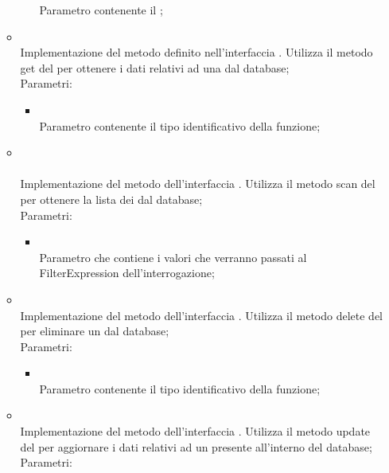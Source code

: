 \begin{itemize}
\begin{itemize}
\begin{itemize}
			Parametro contenente il ;
		\end{itemize}
		\item[]  \\		Implementazione del metodo definito nell'interfaccia . Utilizza il metodo get del  per ottenere i dati relativi ad una  dal database;\\
		Parametri:
		\begin{itemize}
			\item {} \\
			Parametro contenente il tipo identificativo della funzione;
		\end{itemize}
		\item[]  \\\\		Implementazione del metodo dell'interfaccia . Utilizza il metodo scan del \\  per ottenere la lista dei  dal database;\\
		Parametri:
		\begin{itemize}
			\item {} \\
			Parametro che contiene i valori che verranno passati al FilterExpression dell'interrogazione;
		\end{itemize}
		\item[]  \\		Implementazione del metodo dell'interfaccia . Utilizza il metodo delete del  per eliminare un  dal database;\\
		Parametri:
		\begin{itemize}
			\item {} \\
			Parametro contenente il tipo identificativo della funzione;
		\end{itemize}
		\item[]  \\		Implementazione del metodo dell'interfaccia . Utilizza il metodo update del  per aggiornare i dati relativi ad un  presente all'interno del database;\\
		Parametri:

\end{itemize}
\end{itemize}
